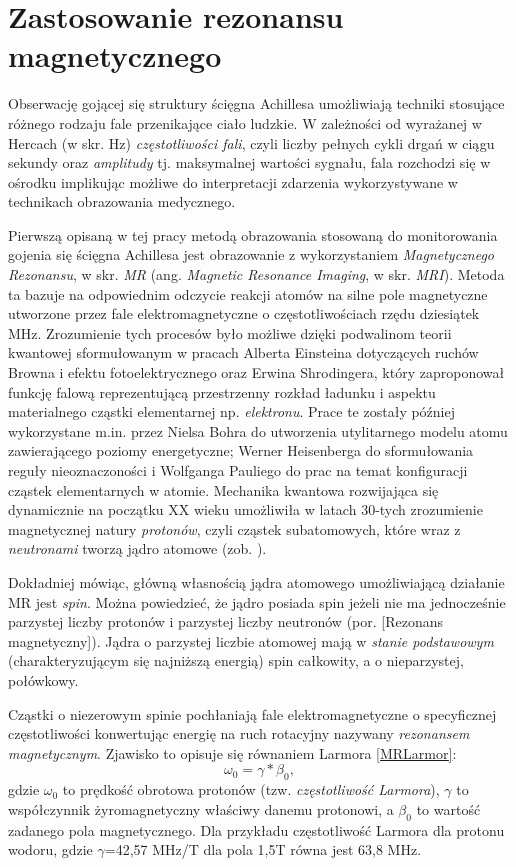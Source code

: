 \section{Zastosowanie rezonansu magnetycznego}
 
Obserwację gojącej się struktury ścięgna Achillesa umożliwiają techniki stosujące różnego rodzaju fale przenikające ciało ludzkie. W zależności od wyrażanej w Hercach (w skr. Hz) \textit{częstotliwości fali}, czyli liczby pełnych cykli drgań w ciągu sekundy oraz \textit{amplitudy} tj. maksymalnej wartości sygnału, fala rozchodzi się w ośrodku implikując możliwe do interpretacji zdarzenia wykorzystywane w technikach obrazowania medycznego. 

Pierwszą opisaną w tej pracy metodą obrazowania stosowaną do monitorowania gojenia się ścięgna Achillesa jest obrazowanie z wykorzystaniem \textit{Magnetycznego Rezonansu}, w skr. \textit{MR} (ang. \textit{Magnetic Resonance Imaging}, w skr. \textit{MRI}). Metoda ta bazuje na odpowiednim odczycie reakcji atomów na silne pole magnetyczne utworzone przez fale elektromagnetyczne o częstotliwościach rzędu dziesiątek MHz. Zrozumienie tych procesów było możliwe dzięki podwalinom teorii kwantowej sformułowanym w pracach Alberta Einsteina dotyczących ruchów Browna i efektu fotoelektrycznego oraz Erwina Shrodingera, który zaproponował funkcję falową reprezentującą przestrzenny rozkład ładunku i aspektu materialnego cząstki elementarnej np. \textit{elektronu}. Prace te zostały później wykorzystane m.in. przez Nielsa Bohra do utworzenia utylitarnego modelu atomu zawierającego poziomy energetyczne; Werner Heisenberga do sformułowania reguły nieoznaczoności i Wolfganga Pauliego do prac na temat konfiguracji cząstek elementarnych w atomie. Mechanika kwantowa rozwijająca się dynamicznie na początku XX wieku umożliwiła w latach 30-tych zrozumienie magnetycznej natury \textit{protonów}, czyli cząstek subatomowych, które wraz z \textit{neutronami} tworzą jądro atomowe (zob. \cite{Frisch1933}). 

Dokładniej mówiąc, główną własnością jądra atomowego umożliwiającą działanie MR jest \textit{spin}. Można powiedzieć, że jądro posiada spin jeżeli nie ma jednocześnie parzystej liczby protonów i parzystej liczby neutronów (por. [Rezonans magnetyczny]). Jądra o parzystej liczbie atomowej mają w \textit{stanie podstawowym} (charakteryzującym się najniższą energią) spin całkowity, a o nieparzystej, połówkowy.

Cząstki o niezerowym spinie pochłaniają fale elektromagnetyczne o specyficznej częstotliwości konwertując energię na ruch rotacyjny nazywany \textit{rezonansem magnetycznym}. Zjawisko to opisuje się równaniem Larmora \ref{MRLarmor}:
\begin{equation}
\label{MRLarmor}
\omega_0 = \gamma \ast \beta_0,
\end{equation}
gdzie $\omega_0$ to prędkość obrotowa protonów (tzw. \textit{częstotliwość Larmora}), $\gamma$ to współczynnik żyromagnetyczny właściwy danemu protonowi, a $\beta_0$ to wartość zadanego pola magnetycznego. Dla przykładu częstotliwość Larmora dla protonu wodoru, gdzie $\gamma$=42,57 MHz/T dla pola 1,5T równa jest 63,8 MHz. 

